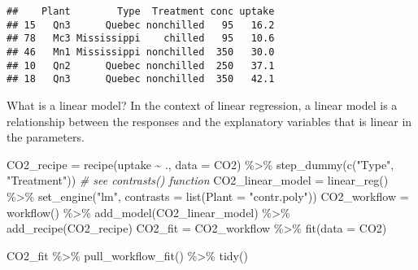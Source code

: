\documentclass[
]{book}
\newenvironment{Shaded}{\begin{snugshade}}{\end{snugshade}}
\newcommand{\AttributeTok}[1]{\textcolor[rgb]{0.77,0.63,0.00}{#1}}
\newcommand{\CommentTok}[1]{\textcolor[rgb]{0.56,0.35,0.01}{\textit{#1}}}
\newcommand{\FunctionTok}[1]{\textcolor[rgb]{0.00,0.00,0.00}{#1}}
\newcommand{\NormalTok}[1]{#1}
\newcommand{\OtherTok}[1]{\textcolor[rgb]{0.56,0.35,0.01}{#1}}
\newcommand{\SpecialCharTok}[1]{\textcolor[rgb]{0.00,0.00,0.00}{#1}}
\newcommand{\StringTok}[1]{\textcolor[rgb]{0.31,0.60,0.02}{#1}}
\begin{document}
\begin{verbatim}
##    Plant        Type  Treatment conc uptake
## 15   Qn3      Quebec nonchilled   95   16.2
## 78   Mc3 Mississippi    chilled   95   10.6
## 46   Mn1 Mississippi nonchilled  350   30.0
## 10   Qn2      Quebec nonchilled  250   37.1
## 18   Qn3      Quebec nonchilled  350   42.1
\end{verbatim}

What is a linear model? In the context of linear regression, a linear
model is a relationship between the responses and the explanatory
variables that is linear in the parameters.

\begin{Shaded}
\begin{Highlighting}[]
\NormalTok{CO2\_recipe }\OtherTok{=} \FunctionTok{recipe}\NormalTok{(uptake }\SpecialCharTok{\textasciitilde{}}\NormalTok{ ., }\AttributeTok{data =}\NormalTok{ CO2) }\SpecialCharTok{\%\textgreater{}\%}
    \FunctionTok{step\_dummy}\NormalTok{(}\FunctionTok{c}\NormalTok{(}\StringTok{"Type"}\NormalTok{, }\StringTok{"Treatment"}\NormalTok{))}
\CommentTok{\# see contrasts() function}
\NormalTok{CO2\_linear\_model }\OtherTok{=} \FunctionTok{linear\_reg}\NormalTok{() }\SpecialCharTok{\%\textgreater{}\%}
    \FunctionTok{set\_engine}\NormalTok{(}\StringTok{"lm"}\NormalTok{, }\AttributeTok{contrasts =} \FunctionTok{list}\NormalTok{(}\AttributeTok{Plant =} \StringTok{"contr.poly"}\NormalTok{))}
\NormalTok{CO2\_workflow }\OtherTok{=} \FunctionTok{workflow}\NormalTok{() }\SpecialCharTok{\%\textgreater{}\%}
    \FunctionTok{add\_model}\NormalTok{(CO2\_linear\_model) }\SpecialCharTok{\%\textgreater{}\%}
    \FunctionTok{add\_recipe}\NormalTok{(CO2\_recipe)}
\NormalTok{CO2\_fit }\OtherTok{=}\NormalTok{ CO2\_workflow }\SpecialCharTok{\%\textgreater{}\%}
    \FunctionTok{fit}\NormalTok{(}\AttributeTok{data =}\NormalTok{ CO2)}
\end{Highlighting}
\end{Shaded}

\begin{Shaded}
\begin{Highlighting}[]
\NormalTok{CO2\_fit }\SpecialCharTok{\%\textgreater{}\%}
    \FunctionTok{pull\_workflow\_fit}\NormalTok{() }\SpecialCharTok{\%\textgreater{}\%}
    \FunctionTok{tidy}\NormalTok{()}
\end{Highlighting}
\end{Shaded}
\end{document}

